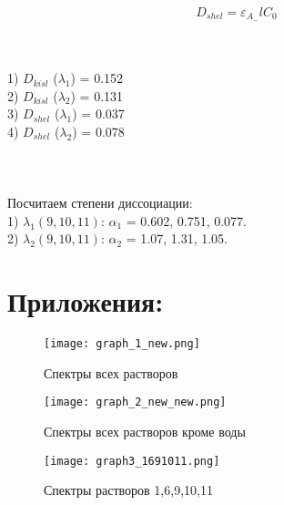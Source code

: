 \documentclass[a4paper,12pt]{article} %
\begin{document}
\begin{equation}
    D_{shel} = \varepsilon_{A_{-}}l C_0
\end{equation}

\quad
\\
\\1) $D_{kisl}$ ($\lambda_1$) =  0.152
\\2) $D_{kisl}$ ($\lambda_2$) =  0.131
\\3) $D_{shel}$ ($\lambda_1$) =  0.037
\\4) $D_{shel}$ ($\lambda_2$) = 0.078

\paragraph{}
\quad
\\
\\Посчитаем степени диссоциации:
\\1) $\lambda_1 (9,10,11)$: $\alpha_1$ = 0.602, 0.751, 0.077.
\\2) $\lambda_2 (9,10,11)$: $\alpha_2$ = 1.07, 1.31, 1.05.

\newpage
\section{Приложения:}

\begin{figure}[!h]
\begin{center}
\texttt{[image: graph\_1\_new.png]}
    \begin{center}
    \caption{Спектры всех растворов}
    \end{center}
\end{center}
\end{figure}

\begin{figure}[!h]
\begin{center}
\texttt{[image: graph\_2\_new\_new.png]}
    \begin{center}
    \caption{Спектры всех растворов кроме воды}
    \end{center}
\end{center}
\end{figure}

\newpage

\begin{figure}[!h]
\begin{center}
\texttt{[image: graph3\_1691011.png]}
    \begin{center}
    \caption{Спектры растворов 1,6,9,10,11}
    \end{center}
\end{center}
\end{figure}
\end{document}
